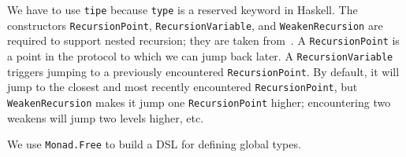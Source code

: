 \documentclass[runningheads,plain]{llncs}
\begin{document}

\noindent We have to use \texttt{tipe} because \texttt{type} is a reserved keyword in Haskell. 
The constructors \texttt{RecursionPoint}, \texttt{RecursionVariable}, and  \texttt{WeakenRecursion} are required to support nested
recursion; they are taken from~\cite{van2017session}. A
\texttt{RecursionPoint} is a point in the protocol to which we can 
jump back later. A \texttt{RecursionVariable} triggers jumping to a
previously encountered \texttt{RecursionPoint}. By default, it will jump
to the closest and most recently encountered \texttt{RecursionPoint},
but \texttt{WeakenRecursion} makes it jump one \texttt{RecursionPoint}
higher; encountering two weakens will jump two levels higher, etc.

We use \texttt{Monad.Free} to build a DSL for defining global types. 
\end{document}
